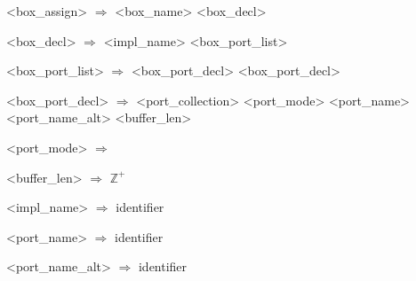 \setlength{\grammarindent}{10em} %
\begin{grammar}
    <box\_assign> $\Rightarrow$ <box\_name> \lit{=} <box\_decl>

    <box\_decl> $\Rightarrow$ \Regex{[}  \Regex{]} \Regex{[}  \Regex{]}  <impl\_name> \lit{(} <box\_port\_list> \lit{)}

    <box\_port\_list> $\Rightarrow$ <box\_port\_decl> \Regex{[} \lit{,} <box\_port\_decl> \Regex{]*}

    <box\_port\_decl> $\Rightarrow$ \Regex{[}  \Regex{]} \Regex{[} <port\_collection> \Regex{]} <port\_mode> \newline
    <port\_name> \Regex{[} \lit{(} <port\_name\_alt> \lit{)} \Regex{]} \Regex{[} \lit{[} <buffer\_len> \lit{]} \Regex{]}

    <port\_mode> $\Rightarrow$ 
    \alt {}

    <buffer\_len> $\Rightarrow$ $\mathbb{Z}^+$

    <impl\_name> $\Rightarrow$ identifier

    <port\_name> $\Rightarrow$ identifier

    <port\_name\_alt> $\Rightarrow$ identifier
\end{grammar}
